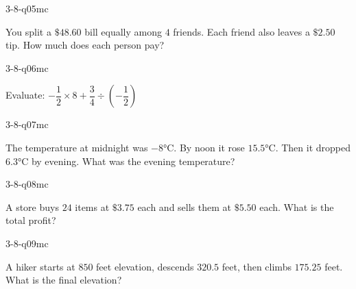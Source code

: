 \begin{practiceQuestion}{3-8-q05}{mc}
\begin{questionText}
You split a $\$48.60$ bill equally among $4$ friends. Each friend also leaves a $\$2.50$ tip. How much does each person pay?
\end{questionText}
\end{practiceQuestion}

\begin{practiceQuestion}{3-8-q06}{mc}
\begin{questionText}
Evaluate: $-\dfrac{1}{2} \times 8 + \dfrac{3}{4} \div \left(-\dfrac{1}{2}\right)$
\end{questionText}
\end{practiceQuestion}

\begin{practiceQuestion}{3-8-q07}{mc}
\begin{questionText}
The temperature at midnight was $-8°$C. By noon it rose $15.5°$C. Then it dropped $6.3°$C by evening. What was the evening temperature?
\end{questionText}
\end{practiceQuestion}

\begin{practiceQuestion}{3-8-q08}{mc}
\begin{questionText}
A store buys $24$ items at $\$3.75$ each and sells them at $\$5.50$ each. What is the total profit?
\end{questionText}
\end{practiceQuestion}

\begin{practiceQuestion}{3-8-q09}{mc}
\begin{questionText}
A hiker starts at $850$ feet elevation, descends $320.5$ feet, then climbs $175.25$ feet. What is the final elevation?
\end{questionText}
\end{practiceQuestion}

